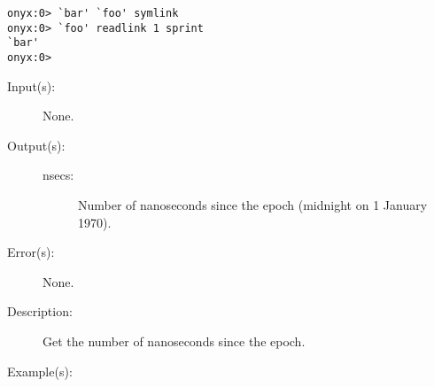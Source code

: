 \begin{description}
\begin{description}
\begin{verbatim}
onyx:0> `bar' `foo' symlink
onyx:0> `foo' readlink 1 sprint
`bar'
onyx:0>
		\end{verbatim}
	\end{description}
\label{systemdict:realtime}
\item[{\onyxop{--}{realtime}{nsecs}}: ]
	\begin{description}\item[]
	\item[Input(s): ] None.
	\item[Output(s): ]
		\begin{description}\item[]
		\item[nsecs: ]
			Number of nanoseconds since the epoch (midnight on 1
			January 1970).
		\end{description}
	\item[Error(s): ] None.
	\item[Description: ]
		Get the number of nanoseconds since the epoch.
	\item[Example(s): ]\begin{verbatim}


\end{verbatim}
\end{description}
\end{description}
